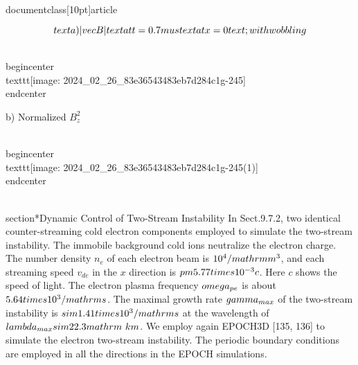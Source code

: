 \\documentclass[10pt]{article}
\begin{document}
{{{{{{$$
\\text { a) }|\\vec{B}| \\text { at } t=0.7 \\mu s \\text { at } x=0 \\text {; with wobbling }
$$

\\begin{center}
\\texttt{[image: 2024\_02\_26\_83e36543483eb7d284c1g-245]}
\\end{center}

b) Normalized $B_{z}^{2}$

\\begin{center}
\\texttt{[image: 2024\_02\_26\_83e36543483eb7d284c1g-245(1)]}
\\end{center}

\\section*{Dynamic Control of Two-Stream Instability}
In Sect.9.7.2, two identical counter-streaming cold electron components employed to simulate the two-stream instability. The immobile background cold ions neutralize the electron charge. The number density $n_{e}$ of each electron beam is $10^{4} / \\mathrm{m}^{3}$, and each streaming speed $v_{d e}$ in the $x$ direction is $\\pm 5.77 \\times 10^{-3} c$. Here $c$ shows the speed of light. The electron plasma frequency $\\omega_{p e}$ is about $5.64 \\times 10^{3} / \\mathrm{s}$. The maximal growth rate $\\gamma_{\\max }$ of the two-stream instability is $\\sim 1.41 \\times 10^{3} / \\mathrm{s}$ at the wavelength of $\\lambda_{\\max } \\sim 22.3 \\mathrm{~km}$. We employ again EPOCH3D [135, 136] to simulate the electron two-stream instability. The periodic boundary conditions are employed in all the directions in the EPOCH simulations.

}}}}}}
\end{document}
